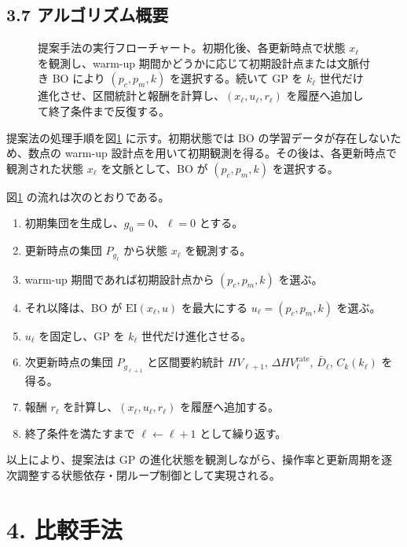 \subsection{3.7 アルゴリズム概要}


\begin{figure}[t]
\centering

\caption{提案手法の実行フローチャート。初期化後、各更新時点で状態 $x_\ell$ を観測し、warm-up 期間かどうかに応じて初期設計点または文脈付き BO により $(p_c,p_m,k)$ を選択する。続いて GP を $k_\ell$ 世代だけ進化させ、区間統計と報酬を計算し、$(x_\ell,u_\ell,r_\ell)$ を履歴へ追加して終了条件まで反復する。}
\label{fig:proposal-flowchart}
\end{figure}

提案法の処理手順を図\ref{fig:proposal-flowchart} に示す。初期状態では BO の学習データが存在しないため、数点の warm-up 設計点を用いて初期観測を得る。その後は、各更新時点で観測された状態 $x_\ell$ を文脈として、BO が $(p_c,p_m,k)$ を選択する。

図\ref{fig:proposal-flowchart} の流れは次のとおりである。

\begin{enumerate}
\item 初期集団を生成し、$g_0 = 0$、$\ell = 0$ とする。
\item 更新時点の集団 $P_{g_\ell}$ から状態 $x_\ell$ を観測する。
\item warm-up 期間であれば初期設計点から $(p_c,p_m,k)$ を選ぶ。
\item それ以降は、BO が $\mathrm{EI}(x_\ell,u)$ を最大にする $u_\ell = (p_c,p_m,k)$ を選ぶ。
\item $u_\ell$ を固定し、GP を $k_\ell$ 世代だけ進化させる。
\item 次更新時点の集団 $P_{g_{\ell+1}}$ と区間要約統計 $HV_{\ell+1}$, $\Delta HV^{\mathrm{rate}}_\ell$, $\bar{D}_\ell$, $C_k(k_\ell)$ を得る。
\item 報酬 $r_\ell$ を計算し、$(x_\ell,u_\ell,r_\ell)$ を履歴へ追加する。
\item 終了条件を満たすまで $\ell \leftarrow \ell + 1$ として繰り返す。
\end{enumerate}


以上により、提案法は GP の進化状態を観測しながら、操作率と更新周期を逐次調整する状態依存・閉ループ制御として実現される。

\section{4. 比較手法}


